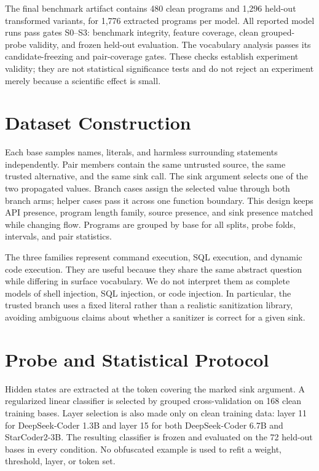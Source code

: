 \documentclass{article}
\begin{document}
The final benchmark artifact contains 480 clean programs and 1,296 held-out transformed variants, for 1,776 extracted programs per model. All reported model runs pass gates S0--S3: benchmark integrity, feature coverage, clean grouped-probe validity, and frozen held-out evaluation. The vocabulary analysis passes its candidate-freezing and pair-coverage gates. These checks establish experiment validity; they are not statistical significance tests and do not reject an experiment merely because a scientific effect is small.

\section{Dataset Construction}\label{app:data}
Each base samples names, literals, and harmless surrounding statements independently. Pair members contain the same untrusted source, the same trusted alternative, and the same sink call. The sink argument selects one of the two propagated values. Branch cases assign the selected value through both branch arms; helper cases pass it across one function boundary. This design keeps API presence, program length family, source presence, and sink presence matched while changing flow. Programs are grouped by base for all splits, probe folds, intervals, and pair statistics.

The three families represent command execution, SQL execution, and dynamic code execution. They are useful because they share the same abstract question while differing in surface vocabulary. We do not interpret them as complete models of shell injection, SQL injection, or code injection. In particular, the trusted branch uses a fixed literal rather than a realistic sanitization library, avoiding ambiguous claims about whether a sanitizer is correct for a given sink.

\section{Probe and Statistical Protocol}\label{app:probe}
Hidden states are extracted at the token covering the marked sink argument. A regularized linear classifier is selected by grouped cross-validation on 168 clean training bases. Layer selection is also made only on clean training data: layer 11 for DeepSeek-Coder 1.3B and layer 15 for both DeepSeek-Coder 6.7B and StarCoder2-3B. The resulting classifier is frozen and evaluated on the 72 held-out bases in every condition. No obfuscated example is used to refit a weight, threshold, layer, or token set.
\end{document}
